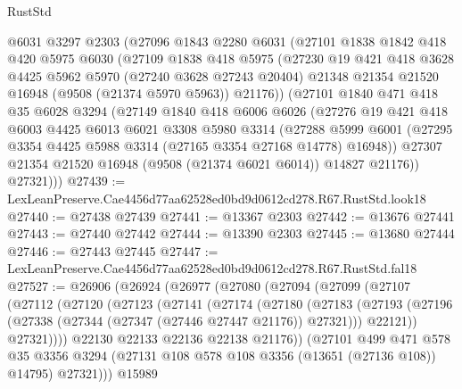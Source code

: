 \begin{lexlean}{RustStd}
\begin{coremodule}
    @6031
    @3297
    @2303
    (@27096
      @1843
      @2280
      @6031
      (@27101
        @1838
        @1842
        @418
        @420
        @5975
        @6030
        (@27109
          @1838
          @418
          @5975
          (@27230
            @19
            @421
            @418
            @3628
            @4425
            @5962
            @5970
            (@27240 @3628 @27243 @20404)
            @21348
            @21354
            @21520
            @16948
            (@9508 (@21374 @5970 @5963))
            @21176))
        (@27101
          @1840
          @471
          @418
          @35
          @6028
          @3294
          (@27149
            @1840
            @418
            @6006
            @6026
            (@27276
              @19
              @421
              @418
              @6003
              @4425
              @6013
              @6021
              @3308
              @5980
              @3314
              (@27288
                @5999
                @6001
                (@27295 @3354 @4425 @5988 @3314 (@27165 @3354 @27168 @14778) @16948))
              @27307
              @21354
              @21520
              @16948
              (@9508 (@21374 @6021 @6014))
              @14827
              @21176))
          @27321)))
@27439 := LexLeanPreserve.Cae4456d77aa62528ed0bd9d0612cd278.R67.RustStd.look18
@27440 := @27438 @27439
@27441 := @13367 @2303
@27442 := @13676 @27441
@27443 := @27440 @27442
@27444 := @13390 @2303
@27445 := @13680 @27444
@27446 := @27443 @27445
@27447 := LexLeanPreserve.Cae4456d77aa62528ed0bd9d0612cd278.R67.RustStd.fal18
@27527 := @26906
    (@26924
      (@26977
        (@27080
          (@27094
            (@27099
              (@27107
                (@27112
                  (@27120
                    (@27123
                      (@27141
                        (@27174
                          (@27180
                            (@27183
                              (@27193
                                (@27196 (@27338 (@27344 (@27347 (@27446 @27447 @21176)) @27321)))
                                @22121))
                            @27321))))
                    @22130
                    @22133
                    @22136
                    @22138
                    @21176))
                (@27101
                  @499
                  @471
                  @578
                  @35
                  @3356
                  @3294
                  (@27131 @108 @578 @108 @3356 (@13651 (@27136 @108)) @14795)
                  @27321)))
            @15989

\end{coremodule}
\end{lexlean}
